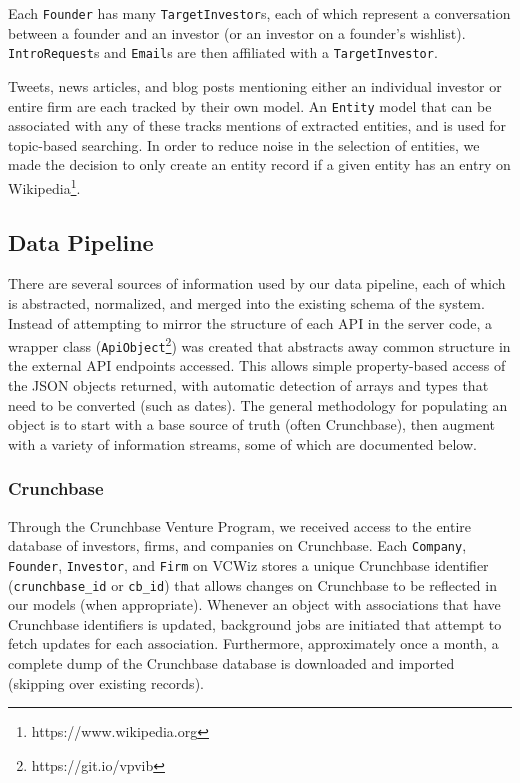 Each \texttt{Founder} has many \texttt{TargetInvestor}s, each of which represent a conversation between a founder and an investor (or an investor on a founder's wishlist). \texttt{IntroRequest}s and \texttt{Email}s are then affiliated with a \texttt{TargetInvestor}.

Tweets, news articles, and blog posts mentioning either an individual investor or entire firm are each tracked by their own model. An \texttt{Entity} model that can be associated with any of these tracks mentions of extracted entities, and is used for topic-based searching. In order to reduce noise in the selection of entities, we made the decision to only create an entity record if a given entity has an entry on Wikipedia\footnote{https://www.wikipedia.org}.

\subsection{Data Pipeline}
\label{ch4:data}

There are several sources of information used by our data pipeline, each of which is abstracted, normalized, and merged into the existing schema of the system.  Instead of attempting to mirror the structure of each API in the server code, a wrapper class (\texttt{ApiObject}\footnote{https://git.io/vpvib}) was created that abstracts away common structure in the external API endpoints accessed. This allows simple property-based access of the JSON objects returned, with automatic detection of arrays and types that need to be converted (such as dates). The general methodology for populating an object is to start with a base source of truth (often Crunchbase), then augment with a variety of information streams, some of which are documented below.

\subsubsection{Crunchbase}

Through the Crunchbase Venture Program, we received access to the entire database of investors, firms, and companies on Crunchbase. Each \texttt{Company}, \texttt{Founder}, \texttt{Investor}, and \texttt{Firm} on VCWiz stores a unique Crunchbase identifier (\texttt{crunchbase\_id} or \texttt{cb\_id}) that allows changes on Crunchbase to be reflected in our models (when appropriate). Whenever an object with associations that have Crunchbase identifiers is updated, background jobs are initiated that attempt to fetch updates for each association. Furthermore, approximately once a month, a complete dump of the Crunchbase database is downloaded and imported (skipping over existing records).

